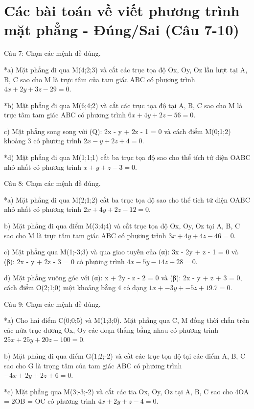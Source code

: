 \documentclass[a4paper,12pt]{article}
\begin{document}
\section*{Các bài toán về viết phương trình mặt phẳng - Đúng/Sai (Câu 7-10)}

Câu 7: Chọn các mệnh đề đúng.

*a) Mặt phẳng đi qua M(4;2;3) và cắt các trục tọa độ Ox, Oy, Oz lần lượt tại A, B, C sao cho M là trực tâm của tam giác ABC có phương trình \(4x + 2y + 3z - 29 = 0\).

*b) Mặt phẳng đi qua M(6;4;2) và cắt các trục tọa độ tại A, B, C sao cho M là trực tâm tam giác ABC có phương trình \(6x + 4y + 2z - 56 = 0\).

c) Mặt phẳng song song với (Q): 2x - y + 2z - 1 = 0 và cách điểm M(0;1;2) khoảng 3 có phương trình \(2x - y + 2z + 4 = 0\).

*d) Mặt phẳng đi qua M(1;1;1) cắt ba trục tọa độ sao cho thể tích tứ diện OABC nhỏ nhất có phương trình \(x + y + z - 3 = 0\).



Câu 8: Chọn các mệnh đề đúng.

*a) Mặt phẳng đi qua M(2;1;2) cắt ba trục tọa độ sao cho thể tích tứ diện OABC nhỏ nhất có phương trình \(2x + 4y + 2z - 12 = 0\).

b) Mặt phẳng đi qua điểm M(3;4;4) và cắt trục tọa độ Ox, Oy, Oz tại A, B, C sao cho M là trực tâm tam giác ABC có phương trình \(3x + 4y + 4z - 46 = 0\).

c) Mặt phẳng qua M(1;-3;3) và qua giao tuyến của (α): 3x - 2y + z - 1 = 0 và (β): 2x - y + 2z - 3 = 0 có phương trình \(4x - 5y - 14z + 28 = 0\).

d) Mặt phẳng vuông góc với (α): x + 2y - z - 2 = 0 và (β): 2x - y + z + 3 = 0, cách điểm O(2;1;0) một khoảng bằng 4 có dạng \(1x + -3y + -5z + 19.7 = 0\).



Câu 9: Chọn các mệnh đề đúng.

*a) Cho hai điểm C(0;0;5) và M(1;3;0). Mặt phẳng qua C, M đồng thời chắn trên các nửa trục dương Ox, Oy các đoạn thẳng bằng nhau có phương trình \(25x + 25y + 20z - 100 = 0\).

b) Mặt phẳng đi qua điểm G(1;2;-2) và cắt các trục tọa độ tại các điểm A, B, C sao cho G là trọng tâm của tam giác ABC có phương trình \(-4x + 2y + 2z + 6 = 0\).

*c) Mặt phẳng qua M(3;-3;-2) và cắt các tia Ox, Oy, Oz tại A, B, C sao cho 4OA = 2OB = OC có phương trình \(4x + 2y + z - 4 = 0\).
\end{document}
